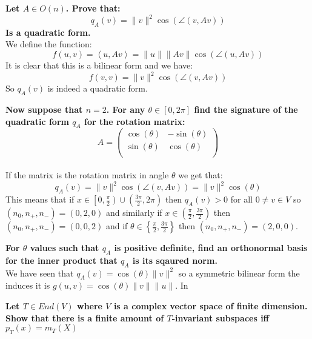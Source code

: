 \documentclass[11pt,a4paper]{article}
\theoremstyle{plain}
\newcommand{\ip}[2]{\left\langle #1, #2 \right\rangle}
\begin{document}
	\newpage
	\noindent
	\textbf{Let $A \in O(n)$. Prove that:
	\[
		q_A(v) = \|v\|^2\cos(\angle(v,Av))
	\]
	Is a quadratic form.} \\
	We define the function:
	\[
		f(u,v) = \ip{u}{Av} = \|u\|\|Av\|\cos(\angle(u,Av))
	\]
	It is clear that this is a bilinear form and we have:
	\[
		f(v,v) = \|v\|^2\cos(\angle(v,Av))
	\]
	So $q_A(v)$ is indeed a quadratic form.
	
	\noindent	\textbf{Now suppose that $n=2$. For any $\theta\in[0,2\pi]$ find the
	signature of the quadratic form $q_A$ for the rotation matrix:
	\[
		A = \begin{pmatrix}
			\cos(\theta) & -\sin(\theta)\\
			\sin(\theta) &  \cos(\theta)\\
		\end{pmatrix}
	\]} \\
	If the matrix is the rotation matrix in angle $\theta$ we get that:
	\[
		q_A(v) = \|v\|^2\cos(\angle(v,Av)) = \|v\|^2\cos(\theta)
	\]
	This means that if 
	$x\in\left[0,\frac{\pi}{2}\right) \cup \left(\frac{3\pi}{2},2\pi\right)$
	then $q_A(v) > 0$ for all $0 \neq v \in V$ so $(n_0,n_+,n_-) = (0,2,0)$ and
	similarly if $x \in \left(\frac{\pi}{2},\frac{3\pi}{2}\right)$ then 
	$(n_0,n_+,n_-) = (0,0,2)$ and if 
	$\theta \in \left\{\frac{\pi}{2},\frac{3\pi}{2}\right\}$ then 
	$(n_0,n_+,n_-) = (2,0,0)$.
	
	\noindent
	\textbf{For $\theta$ values such that $q_A$ is positive definite, find
	an orthonormal basis for the inner product that $q_A$ is its sqaured norm.} \\
	We have seen that $q_A(v) = \cos(\theta)\|v\|^2$ so a symmetric bilinear form
	the induces it is $g(u,v) = \cos(\theta)\|v\|\|u\|$. In 
	
	\newpage
	
	\textbf{Let $T\in End(V)$ where $V$ is a complex vector space of finite
	dimension. Show that there is a finite amount of $T$-invariant subspaces iff
	$p_T(x) = m_T(X)$} \\
	
	
\end{document}
